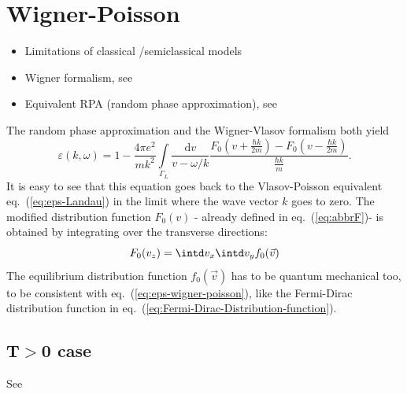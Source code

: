 \documentclass[physics,phd,nolot,nolof]{uccthesis}%
\begin{document}
\clearpage%
\section{Wigner-Poisson}
\begin{itemize}
  \item Limitations of classical /semiclassical models
  \item Wigner formalism, see~\cite{howtomodelqmplasmas}
  \item Equivalent RPA (random phase approximation), see~\cite{pineselementary}
\end{itemize}
The random phase approximation\cite{pineselementary} and the  Wigner-Vlasov formalism\cite{howtomodelqmplasmas} both yield
 \begin{equation}
\varepsilon(k,\omega)=1-\frac{4\pi e^2}{m k^2}
\int\limits_{\Gamma_L}\frac{\mathrm{d} v}{v-\omega/k}  \frac{F_0(v+\frac{\hbar k}{2m})-F_0(v-\frac{\hbar k}{2m})}{\frac{\hbar k}{m}}.
  \label{eq:eps-wigner-poisson}
\end{equation}
It is easy to see that this equation goes back to the Vlasov-Poisson equivalent eq.~(\ref{eq:eps-Landau}) in the limit where the wave vector $k$ goes to zero.
The modified distribution function $F_0(v)$ - already defined in eq.~(\ref{eq:abbrF})- is obtained by integrating over the transverse directions:
\begin{equation}
  F_0(v_z)=\intd v_x \intd v_y f_0(\vec v)
  \label{eq:F_0}
\end{equation}
The equilibrium distribution function $f_0(\vec v)$ has to be quantum mechanical too, to be consistent with eq.~(\ref{eq:eps-wigner-poisson}),
like the Fermi-Dirac distribution function in eq.~(\ref{eq:Fermi-Dirac-Distribution-function}).
\subsection{T$>$0 case}
See \cite{finiteT-lindhard}
\end{document}
